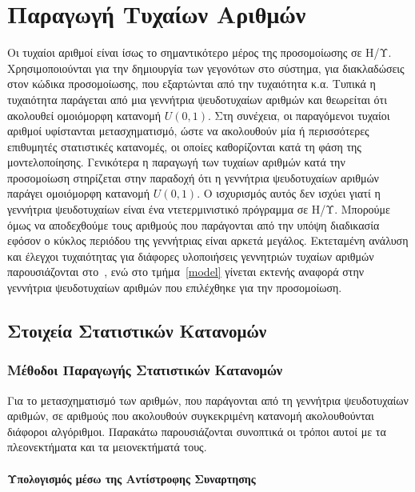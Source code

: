 \documentclass[12pt]{report}
\begin{document}
\section{Παραγωγή Τυχαίων Αριθμών}
Οι τυχαίοι αριθμοί είναι ίσως το σημαντικότερο μέρος της προσομοίωσης σε Η/Υ. Χρησιμοποιούνται για την δημιουργία των γεγονότων στο σύστημα, για διακλαδώσεις στον κώδικα προσομοίωσης, που εξαρτώνται από την τυχαιότητα κ.α. Τυπικά η τυχαιότητα παράγεται από μια γεννήτρια ψευδοτυχαίων αριθμών και θεωρείται ότι ακολουθεί ομοιόμορφη κατανομή \(U(0, 1)\). Στη συνέχεια, οι παραγόμενοι τυχαίοι αριθμοί υφίστανται μετασχηματισμό, ώστε να ακολουθούν μία ή περισσότερες επιθυμητές στατιστικές κατανομές, οι οποίες καθορίζονται κατά τη φάση της μοντελοποίησης. Γενικότερα η παραγωγή των τυχαίων αριθμών κατά την προσομοίωση στηρίζεται στην παραδοχή ότι η γεννήτρια ψευδοτυχαίων αριθμών παράγει ομοιόμορφη κατανομή \(U(0, 1)\). Ο ισχυρισμός αυτός δεν ισχύει γιατί η γεννήτρια ψευδοτυχαίων είναι ένα ντετερμινιστικό πρόγραμμα σε Η/Υ. Μπορούμε όμως να αποδεχθούμε τους αριθμούς που παράγονται από την υπόψη διαδικασία εφόσον ο κύκλος περιόδου της γεννήτριας είναι αρκετά μεγάλος. Εκτεταμένη ανάλυση και έλεγχοι τυχαιότητας για διάφορες υλοποιήσεις γεννητριών τυχαίων αριθμών παρουσιάζονται στο~\cite{book:06}, ενώ στο τμήμα~\ref{model} γίνεται εκτενής αναφορά στην γεννήτρια ψευδοτυχαίων αριθμών που επιλέχθηκε για την προσομοίωση.

\subsection{Στοιχεία Στατιστικών Κατανομών}
\subsubsection{Μέθοδοι Παραγωγής Στατιστικών Κατανομών}
Για το μετασχηματισμό των αριθμών, που παράγονται από τη γεννήτρια ψευδοτυχαίων αριθμών, σε αριθμούς που ακολουθούν συγκεκριμένη κατανομή ακολουθούνται διάφοροι αλγόριθμοι. Παρακάτω παρουσιάζονται συνοπτικά οι τρόποι αυτοί με τα πλεονεκτήματα και τα μειονεκτήματά τους.
\paragraph{Υπολογισμός μέσω της Αντίστροφης Συναρτησης}
\paragraph{}
\paragraph{}
\end{document}

